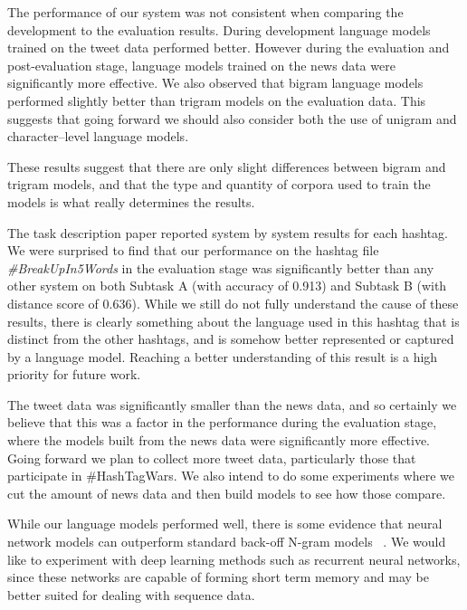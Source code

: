 \documentclass[11pt,a4paper]{article}
\begin{document}
The performance of our system was not consistent when
comparing the development to the evaluation results.
During development language models trained on the
tweet data performed better.
However during the evaluation and post-evaluation stage, 
language models trained on the news data were 
significantly more effective. We also observed that
bigram language models performed slightly better than
trigram models on the evaluation data. This suggests
that going forward we should also consider both the use of
unigram and character--level language models. 

These results suggest that there are only 
slight differences between bigram and trigram models,
and that the type and quantity of corpora used to train the 
models is what really determines the results. 

The task description paper \cite{PotashRR17} 
reported system by system results for each hashtag. 
We were surprised to find that our 
performance on the hashtag file 
\textit{\#BreakUpIn5Words} in the evaluation 
stage was significantly 
better than any other  system on both Subtask A 
(with accuracy of 0.913) and Subtask B 
(with distance score of 0.636). While we still do not 
fully understand the cause of these results, there is clearly
something about the language used in this hashtag that
is distinct from the other hashtags, and is somehow better
represented or captured by a language model. Reaching a better
understanding of this  result is a high priority for future work. 

The tweet data was significantly smaller than the news data, and
so certainly we believe that this was a factor in the performance
during the evaluation stage, where the models built from the news
data were significantly more effective. Going forward we plan to
collect more tweet data, particularly those that participate in 
\#HashTagWars. We also intend to do some experiments where we 
cut the amount of news data and then build models to see how 
those compare. 

While our language models performed well, there
is some evidence that neural network models
can outperform 
standard back-off N-gram models ~\cite{mikolov2011extensions}. 
We would like to experiment with deep learning methods such 
as recurrent neural networks, since 
these networks are capable of 
forming short term memory and may be better suited for dealing 
with sequence data. 

\end{document}
